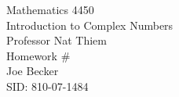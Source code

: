 \begin{titlepage}
\setlength{\topmargin}{1.5in}
\begin{center}
\Huge{Mathematics 4450} \\
\LARGE{Introduction to Complex Numbers} \\
\Large{Professor Nat Thiem} \\[1cm]

\huge{Homework \#\HWnum}\\[0.5cm]

\large{Joe Becker} \\
\large{SID: 810-07-1484} \\
\large{\due} 

\end{center}

\end{titlepage}

